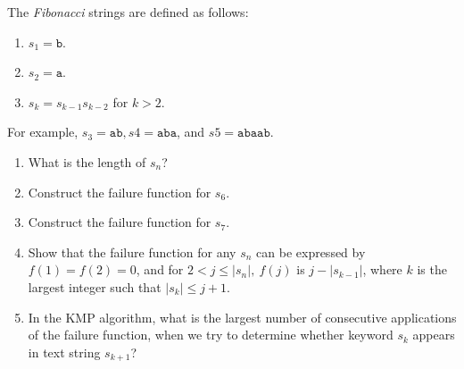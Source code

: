 \begin{exercise}\label{ex:030409}
    The \emph{Fibonacci} strings are defined as follows:
    \begin{enumerate}
        \item $s_1 = \texttt{b}$.
        \item $s_2 = \texttt{a}$.
        \item $s_k = s_{k-1}s_{k-2}$ for $k > 2$.
    \end{enumerate}
    For example, $s_3 = \texttt{ab}, s4 = \texttt{aba}$, and $s5 =
    \texttt{abaab}$.
    \begin{enumerate}[label=\alph*)]
        \item What is the length of $s_n$?
        \item Construct the failure function for $s_6$.
        \item Construct the failure function for $s_7$.
        \item Show that the failure function for any $s_n$ can be expressed by 
        $f(1) = f(2) = 0$, and for $2 < j \le |s_n|,\ f(j)$ is $j - |s_{k-1}|$,
        where $k$ is the largest integer such that $|s_k| \le j + 1$.
        \item In the KMP algorithm, what is the largest number of consecutive 
        applications of the failure function, when we try to determine whether 
        keyword $s_k$ appears in text string $s_{k+1}$?
    \end{enumerate}
\end{exercise}